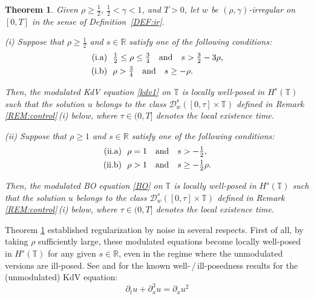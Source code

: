 \documentclass[letterpaper, 11pt,  reqno]{amsart}
\newtheorem{oldtheorem}{Theorem}
\newcommand{\1}{\hspace{0.5mm}\text{I}\hspace{0.5mm}}
\newcommand{\noi}{\noindent}
\newcommand{\R}{\mathbb{R}}
\newcommand{\T}{\mathbb{T}}
\newcommand{\g}{\gamma}
\newcommand{\dx}{\partial_x}
\newcommand{\dt}{\partial_t}
\newcommand{\cD}{\mathscr{D}}
\numberwithin{equation}{section}
\numberwithin{theorem}{section}
\begin{document}
\begin{oldtheorem}\label{THM:1}
Given $\rho \ge\frac 12$,  $\frac12< \g < 1$, and $T> 0$, 
let  $w$ be $(\rho,\g)$-irregular on $[0, T]$ in the sense of Definition~\ref{DEF:ir}.

\smallskip

\noi
\textup{(i)}
Suppose that $\rho \ge \frac 12$ and $s\in \R$
satisfy one of the following conditions\textup{:}
\begin{align}
\begin{split}
\textup{(i.a)} &\ \  \tfrac 12 \le \rho \le \tfrac 34 \quad \text{and} \quad 
s > \tfrac 32 - 3 \rho, \\
\textup{(i.b)} &\ \  \rho > \tfrac 34\quad  \text{and} \quad  s \ge - \rho.
\end{split}
\label{nonlin1b}
\end{align}


\noi
Then, the modulated KdV equation \eqref{kdv1}
on  $\T$
is %
locally well-posed in $H^s(\T)$
such that the solution $u$ belongs to the class
$ \cD_{w}^s([0, \tau] \times \T)$
defined in Remark \ref{REM:control}\,(i) below, 
where $\tau \in (0, T]$
denotes the local existence time.







\smallskip

\noi
\textup{(ii)}
Suppose that $\rho \ge 1$ and $s\in \R$
satisfy one of the following conditions\textup{:}
\begin{align}
\begin{split}
\textup{(ii.a)} &\ \   \rho =  1 \quad \text{and} \quad s > - \tfrac 12, \\
\textup{(ii.b)} &\ \  \rho >  1 \quad  \text{and} \quad  s \ge - \tfrac 12 \rho.
\end{split}
\label{regBO1}
\end{align}



\noi
Then, the modulated BO equation \eqref{BO}
on  $\T$
is %
locally well-posed in $H^s(\T)$
such that the solution $u$ belongs to the class
$ \cD_{w}^s([0, \tau] \times \T)$
defined in Remark \ref{REM:control}\,(i) below, 
where $\tau \in (0, T]$
denotes the local existence time.




\end{oldtheorem}




Theorem \ref{THM:1}
established regularization by noise
in several respects.
First of all, by taking $\rho$ sufficiently large, 
these  modulated equations
become locally well-posed
in $H^s(\T)$ for
any given $s \in \R$, 
even in the regime
where the unmodulated versions
are ill-posed.
See
\cite{KPV96, CKSTT03, 
KT1, M12,  KV19}
and 
\cite{Moli1, Moli2, 
Deng15, 
GKT23, KLV}
for the known well-\,/\,ill-posedness
results
for the (unmodulated) KdV equation:
\begin{equation}
\dt u+  \dx^3 u  =\dx u^2
\label{kdv2}
\end{equation}
\end{document}
